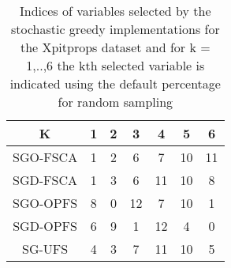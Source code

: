 \begin{table}
	\begin{center}
		\begin{tabular}{c c c c c c c}
			K & 1 & 2 & 3 & 4 & 5 & 6 \\
			\hline
			SGO-FSCA & 1 & 2 & 6 & 7 & 10 & 11 \\
			SGD-FSCA & 1 & 3 & 6 & 11 & 10 & 8 \\
			SGO-OPFS & 8 & 0 & 12 & 7 & 10 & 1 \\
			SGD-OPFS & 6 & 9 & 1 & 12 & 4 & 0 \\
			SG-UFS & 4 & 3 & 7 & 11 & 10 & 5 \\
		\end{tabular}
	\end{center}
	\caption{Indices of variables selected by the stochastic greedy implementations for the Xpitprops dataset and for k = 1,..,6 the kth selected variable is indicated using the default percentage for random sampling}
\end{table}
